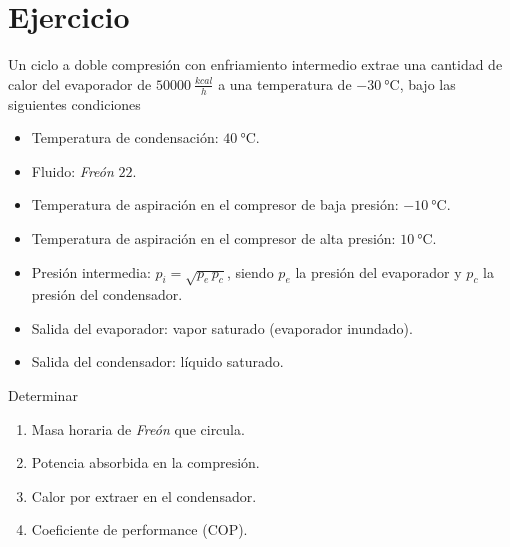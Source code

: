 \section{Ejercicio}\label{ej:Chap11Ejercicio11}
Un ciclo a doble compresión con enfriamiento intermedio extrae una cantidad de calor del evaporador de $\SI{50000}{\frac{kcal}{h}}$ a una temperatura de $\SI{-30}{\celsius}$, bajo las siguientes condiciones
\begin{itemize}
    \item Temperatura de condensación: $\SI{40}{\celsius}$.
    \item Fluido: \textit{Freón} $22$.
    \item Temperatura de aspiración en el compresor de baja presión: $\SI{-10}{\celsius}$.
    \item Temperatura de aspiración en el compresor de alta presión: $\SI{10}{\celsius}$.
    \item Presión intermedia: $p_i=\sqrt{p_e\,p_c}$, siendo $p_e$ la presión del evaporador y $p_c$ la presión del condensador.
    \item Salida del evaporador: vapor saturado (evaporador inundado).
    \item Salida del condensador: líquido saturado.
\end{itemize}

Determinar
\begin{enumerate}
    \item Masa horaria de \textit{Freón} que circula.
    \item Potencia absorbida en la compresión.
    \item Calor por extraer en el condensador.
    \item Coeficiente de performance (COP).
\end{enumerate}